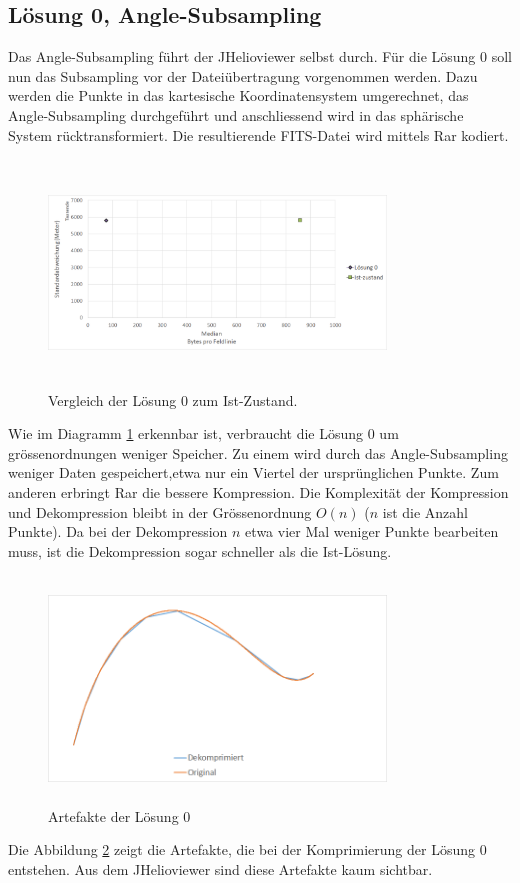 \subsection{Lösung 0, Angle-Subsampling} \label{resultate:loesung0}
Das Angle-Subsampling führt der JHelioviewer selbst durch. Für die Lösung 0 soll nun das Subsampling vor der Dateiübertragung vorgenommen werden. Dazu werden die Punkte in das kartesische Koordinatensystem umgerechnet, das Angle-Subsampling durchgeführt und anschliessend wird in das sphärische System rücktransformiert. Die resultierende FITS-Datei wird mittels Rar kodiert.
\begin{figure}[!htbp]
	\center
	\includegraphics[width=0.8\textwidth,height=6cm,keepaspectratio]{./pictures/resultate/loesung0/loesung0_0.png}
	\caption{Vergleich der Lösung 0 zum Ist-Zustand.}
	\label{resultate:loesung0:loesung0_0}
\end{figure}
Wie im Diagramm \ref{resultate:loesung0:loesung0_0} erkennbar ist, verbraucht die Lösung 0 um grössenordnungen weniger Speicher. Zu einem wird durch das Angle-Subsampling weniger Daten gespeichert,etwa nur ein Viertel der ursprünglichen Punkte. Zum anderen erbringt Rar die bessere Kompression. Die Komplexität der Kompression und Dekompression bleibt in der Grössenordnung $O(n)$ ($n$ ist die Anzahl Punkte). Da bei der Dekompression $n$ etwa vier Mal weniger Punkte bearbeiten muss, ist die Dekompression sogar schneller als die Ist-Lösung.
\begin{figure}[!htbp]
	\center
	\includegraphics[width=0.8\textwidth,height=6cm,keepaspectratio]{./pictures/resultate/loesung0/loesung0_artefakte.png}
	\caption{Artefakte der Lösung 0}
	\label{resultate:loesung0:artefakte}
\end{figure}
Die Abbildung \ref{resultate:loesung0:artefakte} zeigt die Artefakte, die bei der Komprimierung der Lösung 0 entstehen. Aus dem JHelioviewer sind diese Artefakte kaum sichtbar.

